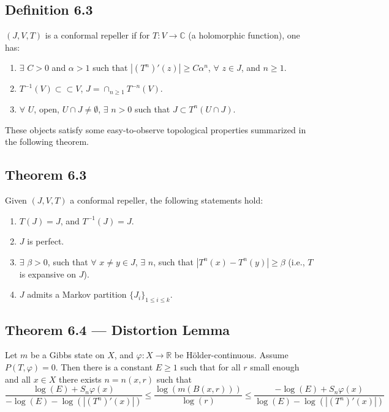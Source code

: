 \documentclass[11pt,a4paper]{article}
\begin{document}
\subsection*{Definition 6.3}
    $(J, V, T)$ is a conformal repeller if for $T:V\rightarrow \mathbb{C}$ (a holomorphic function), one has:
    \begin{enumerate}
        \item $\exists$ $C>0$ and $\alpha > 1$ such that $|(T^n)'(z)| \geq C\alpha^n$, $\forall$ $z\in J$, and $n\geq 1$.
        \item $T^{-1}(V) \subset \subset V$, $J = \cap_{n\geq 1}T^{-n}(V)$.
        \item $\forall$ $U$, open, $U\cap J \neq \emptyset$, $\exists$ $n>0$ such that $J \subset T^n(U\cap J)$.
    \end{enumerate}

These objects satisfy some easy-to-observe topological properties summarized
in the following theorem.
\subsection*{Theorem 6.3}
    Given $(J, V, T)$ a conformal repeller, the following statements hold:
    \begin{enumerate}
        \item $T(J) = J$, and $T^{-1}(J) = J$.
        \item $J$ is perfect.
        \item $\exists$ $\beta >0$, such that $\forall$ $x\neq y \in J$, $\exists$ $n$, such that $|T^n(x) - T^n(y)|\geq \beta$ (i.e., $T$ is expansive on $J$).
        \item $J$ admits a Markov partition $\{J_i\}_{1\leq i\leq k}$.
    \end{enumerate}


\subsection*{Theorem 6.4 — Distortion Lemma}
    Let $m$ be a Gibbs state on $X$, and $\varphi: X\rightarrow \mathbb{R}$ be H\"older-continuous. Assume $P(T,\varphi) =0$. Then there is a constant $E\geq 1$ such that for all $r$ small enough and all $x\in X$ there exists $n = n(x, r)$ such that
    $$\frac{\log(E) + S_n\varphi(x)}{-\log(E) - \log(|(T^n)'(x)|)} \leq \frac{\log(m(B(x, r)))}{\log(r)} \leq \frac{-\log(E) + S_n\varphi(x)}{\log(E) - \log(|(T^n)'(x)|)}$$
\end{document}

